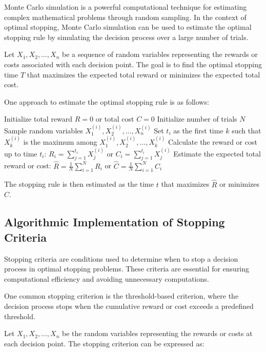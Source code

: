 \documentclass[12pt]{book} %
\begin{document}
Monte Carlo simulation is a powerful computational technique for estimating complex mathematical problems through random sampling. In the context of optimal stopping, Monte Carlo simulation can be used to estimate the optimal stopping rule by simulating the decision process over a large number of trials.

Let \(X_1, X_2, \ldots, X_n\) be a sequence of random variables representing the rewards or costs associated with each decision point. The goal is to find the optimal stopping time \(T\) that maximizes the expected total reward or minimizes the expected total cost.

One approach to estimate the optimal stopping rule is as follows:

\begin{algorithm}
\caption{Monte Carlo Simulation for Estimating Stopping Rules}
\begin{algorithmic}[1]
\State Initialize total reward \(R = 0\) or total cost \(C = 0\)
\State Initialize number of trials \(N\)
    \State Sample random variables \(X_1^{(i)}, X_2^{(i)}, \ldots, X_n^{(i)}\)
    \State Set \(t_i\) as the first time \(k\) such that \(X_k^{(i)}\) is the maximum among \(X_1^{(i)}, X_2^{(i)}, \ldots, X_k^{(i)}\)
    \State Calculate the reward or cost up to time \(t_i\): \(R_i = \sum_{j=1}^{t_i} X_j^{(i)}\) or \(C_i = \sum_{j=1}^{t_i} X_j^{(i)}\)
\EndFor
\State Estimate the expected total reward or cost: \(\hat{R} = \frac{1}{N} \sum_{i=1}^{N} R_i\) or \(\hat{C} = \frac{1}{N} \sum_{i=1}^{N} C_i\)
\end{algorithmic}
\end{algorithm}
\FloatBarrier
The stopping rule is then estimated as the time \(t\) that maximizes \(\hat{R}\) or minimizes \(\hat{C}\).

\subsection{Algorithmic Implementation of Stopping Criteria}

Stopping criteria are conditions used to determine when to stop a decision process in optimal stopping problems. These criteria are essential for ensuring computational efficiency and avoiding unnecessary computations.

One common stopping criterion is the threshold-based criterion, where the decision process stops when the cumulative reward or cost exceeds a predefined threshold.

Let \(X_1, X_2, \ldots, X_n\) be the random variables representing the rewards or costs at each decision point. The stopping criterion can be expressed as:
\end{document}
